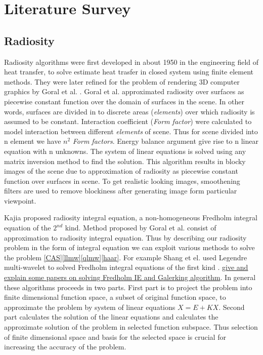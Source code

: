 \chapter{\label{ch:literature}Literature Survey}
\section{Radiosity}


Radiosity algorithms were first developed in about 1950 in the engineering field of heat transfer, to solve estimate heat trasfer in closed system using finite element methods. They were later refined for the problem of rendering 3D computer graphics by Goral et al. \cite{Goral}. Goral et al. approximated  radiosity over surfaces as piecewise constant function over the domain of surfaces in the scene. In other words, surfaces are divided in to discrete areas ({\em elements}) over which radiosity is assumed to be constant. Interaction coefficient ({\em Form factor}) were calculated to model interaction between different {\em elements} of scene. Thus for scene divided into n element we have $n^2$  {\em Form factors}. Energy balance argument give rise to n linear equation with n unknowns. The system of linear equations is solved using any matrix inversion method to find the solution. This algorithm results in blocky images of the scene due to approximation of radiosity as piecewise constant function over surfaces in scene. To get realistic looking images, smoothening filters are used to remove blockiness after generating image form particular viewpoint. 

Kajia \cite{Kajiya} proposed radiosity integral equation, a non-homogeneous Fredholm integral equation of the $2^{nd}$ kind.  Method proposed by Goral et al. \cite{Goral} consist of  approximation to radiosity integral equation. Thus by describing  our radiosity problem in the form of integral equation  we can exploit various methods to solve the problem \cite{iemethod1} \cite{iemethod2} \cite{ie} \cite{iesurvey} \underline{[CAS][llmw][qlmw][haar]}. For example  Shang et el. used Legendre multi-wavelet to solved Fredholm integral equations of the first kind \cite{shang}. \underline{ give and explain some papers on solving Fredholm IE and Galerking algorithm}. In general these algorithms proceeds in two parts. First part is to project the problem into finite dimensional function space, a subset of original function space, to approximate the problem by system of linear equations $X=E+KX$. Second part calculates the solution of the linear equations and calculates the approximate solution of the problem in selected function subspace. Thus selection of finite dimensional space and basis for the selected space is crucial for increasing the accuracy of the problem.

